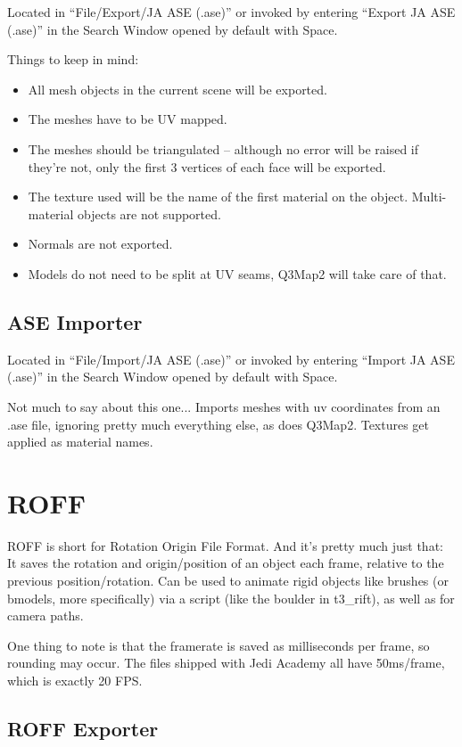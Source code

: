 \documentclass[a4paper,10pt]{article}
\begin{document}
 Located in ``File/Export/JA ASE (.ase)'' or invoked by entering ``Export JA ASE (.ase)'' in the Search Window
 opened by default with Space.
 
 Things to keep in mind:
 \begin{itemize}
  \item All mesh objects in the current scene will be exported.
  \item The meshes have to be UV mapped.
  \item The meshes should be triangulated -- although no error will be raised if they're not, only the first
  3 vertices of each face will be exported.
  \item The texture used will be the name of the first material on the object. Multi-material objects are not
  supported.
  \item Normals are not exported.
  \item Models do not need to be split at UV seams, Q3Map2 will take care of that.
 \end{itemize}
 
 \subsection{ASE Importer}
 
 Located in ``File/Import/JA ASE (.ase)'' or invoked by entering ``Import JA ASE (.ase)'' in the Search Window
 opened by default with Space.
 
 Not much to say about this one... Imports meshes with uv coordinates from an .ase file, ignoring pretty much
 everything else, as does Q3Map2. Textures get applied as material names.
 
 \section{ROFF}
 
 ROFF is short for Rotation Origin File Format. And it's pretty much just that: It saves the rotation and
 origin/position of an object each frame, relative to the previous position/rotation. Can be used to animate
 rigid objects like brushes (or bmodels, more specifically) via a script (like the boulder in t3\_rift), as
 well as for camera paths.
 
 One thing to note is that the framerate is saved as milliseconds per frame, so rounding may occur. The
 files shipped with Jedi Academy all have 50ms/frame, which is exactly 20 FPS.
 
 \subsection{ROFF Exporter}
 
\end{document}
